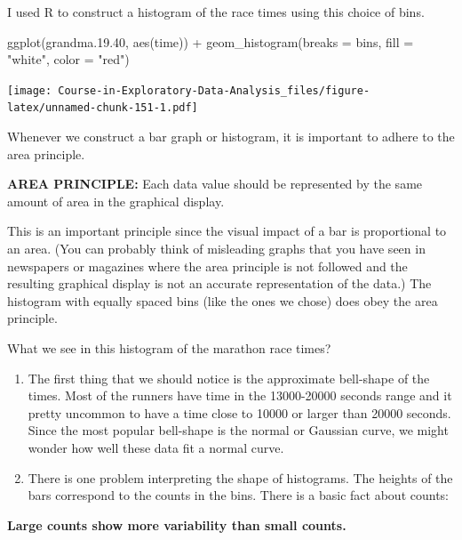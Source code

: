 \documentclass[
]{book}
\newenvironment{Shaded}{\begin{snugshade}}{\end{snugshade}}
\newcommand{\AttributeTok}[1]{\textcolor[rgb]{0.77,0.63,0.00}{#1}}
\newcommand{\FloatTok}[1]{\textcolor[rgb]{0.00,0.00,0.81}{#1}}
\newcommand{\FunctionTok}[1]{\textcolor[rgb]{0.00,0.00,0.00}{#1}}
\newcommand{\NormalTok}[1]{#1}
\newcommand{\SpecialCharTok}[1]{\textcolor[rgb]{0.00,0.00,0.00}{#1}}
\newcommand{\StringTok}[1]{\textcolor[rgb]{0.31,0.60,0.02}{#1}}
\begin{document}
I used R to construct a histogram of the race times using this choice of bins.

\begin{Shaded}
\begin{Highlighting}[]
\FunctionTok{ggplot}\NormalTok{(grandma.}\FloatTok{19.40}\NormalTok{, }\FunctionTok{aes}\NormalTok{(time)) }\SpecialCharTok{+}
  \FunctionTok{geom\_histogram}\NormalTok{(}\AttributeTok{breaks =}\NormalTok{ bins,}
                 \AttributeTok{fill =} \StringTok{"white"}\NormalTok{, }
                 \AttributeTok{color =} \StringTok{"red"}\NormalTok{)}
\end{Highlighting}
\end{Shaded}

\texttt{[image: Course-in-Exploratory-Data-Analysis\_files/figure-latex/unnamed-chunk-151-1.pdf]}

Whenever we construct a bar graph or histogram, it is important to adhere to the area principle.

\textbf{AREA PRINCIPLE:} Each data value should be represented by the
same amount of area in the graphical display.

This is an important principle since the visual impact of a bar is proportional to an area. (You can probably think of misleading graphs that you have seen in newspapers or magazines where the area principle is not followed and the resulting graphical display is not an accurate representation of the data.) The histogram with equally spaced bins (like the ones we chose) does obey the area principle.

What we see in this histogram of the marathon race times?

\begin{enumerate}
\def\labelenumi{\arabic{enumi}.}
\item
  The first thing that we should notice is the approximate bell-shape of the times. Most of the runners have time in the 13000-20000 seconds range and it pretty uncommon to have a time close to 10000 or larger than 20000 seconds. Since the most popular bell-shape is the normal or Gaussian curve, we might wonder how well these data fit a normal curve.
\item
  There is one problem interpreting the shape of histograms. The heights of the bars correspond to the counts in the bins. There is a basic fact about counts:
\end{enumerate}

\textbf{Large counts show more variability than small counts.}
\end{document}

